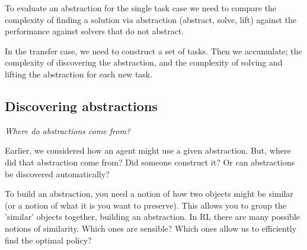 To evaluate an abstraction for the single task case we need to compare the complexity of
finding a solution via abstraction (abstract, solve, lift) against the performance against
solvers that do not abstract.

In the transfer case, we need to construct a set of tasks. Then we accumulate; the
complexity of discovering the abstraction, and the complexity of solving
and lifting the abstraction for each new task.

%
%
%
%



\subsection{Discovering abstractions}

\begin{displayquote}
  \textsl{Where do abstractions come from?}
\end{displayquote}

Earlier, we considered how an agent might use a given abstraction.
But, where did that abstraction come from? Did someone construct it?
Or can abstractions be discovered automatically?

To build an abstraction, you need a notion of how two objects might be
similar (or a notion of what it is you want to preserve).
This allows you to group the 'similar' objects together, building an abstraction.
In RL there are many possible notions of similarity. Which ones are sensible?
Which ones allow us to efficiently find the optimal policy?

